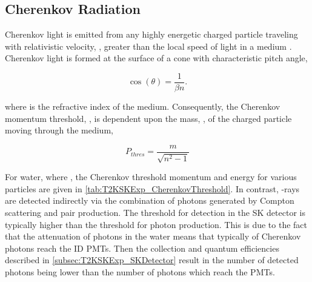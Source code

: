 \subsection{Cherenkov Radiation}
\label{subsec:T2KSKExp_Cherenkov}

Cherenkov light is emitted from any highly energetic charged particle traveling with relativistic velocity, \quickmath{\beta}, greater than the local speed of light in a medium \cite{Cerenkov1937-tl}.
Cherenkov light is formed at the surface of a cone with characteristic pitch angle,

\begin{equation}
  \label{eq:T2KSKExp_CherenkovConeAngle}
  \cos(\theta)=\frac{1}{\beta n}.
\end{equation}

where  is the refractive index of the medium. Consequently, the Cherenkov momentum threshold, , is dependent upon the mass, , of the charged particle moving through the medium, 

\begin{equation}
  P_{thres} = \frac{m}{\sqrt{n^{2}-1}}
\end{equation}

For water, where , the Cherenkov threshold momentum and energy for various particles are given in \autoref{tab:T2KSKExp_CherenkovThreshold}. In contrast, \quickmath{\gamma}-rays are detected indirectly via the combination of photons generated by Compton scattering and pair production. The threshold for detection in the SK detector is typically higher than the threshold for photon production. This is due to the fact that the attenuation of photons in the water means that typically  of Cherenkov photons reach the ID PMTs. Then the collection and quantum efficiencies described in \autoref{subsec:T2KSKExp_SKDetector} result in the number of detected photons being lower than the number of photons which reach the PMTs. 

